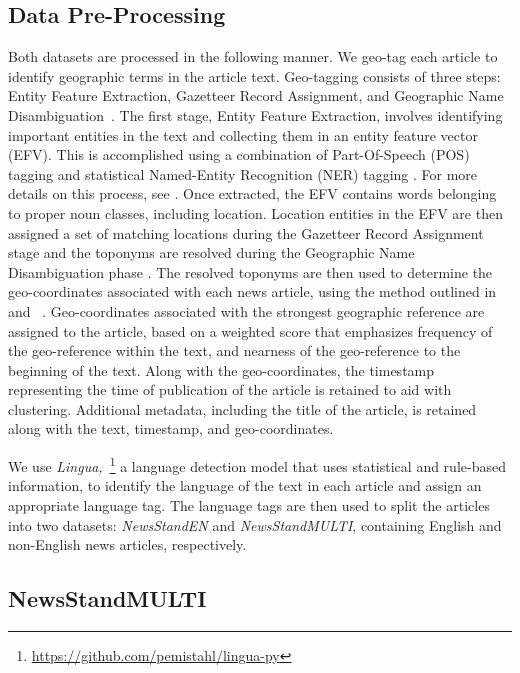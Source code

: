 \subsection{Data Pre-Processing}
Both datasets are processed in the following manner.
We geo-tag each article to identify geographic terms in the article text.
Geo-tagging consists of three steps: Entity Feature Extraction, Gazetteer Record Assignment, and Geographic Name Disambiguation~\cite{Teit08}. 
The first stage, Entity Feature Extraction, involves identifying important entities in the text and collecting them in an entity feature vector (EFV). 
This is accomplished using a combination of Part-Of-Speech (POS) tagging and statistical Named-Entity Recognition (NER) tagging \cite{NER}. 
For more details on this process, see \cite{Same09d, Lieb07, Ho12}. 
Once extracted, the EFV contains words belonging to proper noun classes, including location. 
Location entities in the EFV are then assigned a set of matching locations during the Gazetteer Record Assignment stage and the toponyms are resolved during the Geographic Name Disambiguation phase \cite{Leid11, Lieb10b, Lieb11, Lieb12, Same14b, Schn21}.
The resolved toponyms are then used to determine the geo-coordinates associated with each news article, using the method outlined in \citeauthor{Teit08}~\cite{Teit08} and \citeauthor{Lieb07}~\cite{Lieb07}.
Geo-coordinates associated with the strongest geographic reference are assigned to the article, based on a weighted score that emphasizes frequency of the geo-reference within the text, and nearness of the geo-reference to the beginning of the text. 
Along with the geo-coordinates, the timestamp representing the time of publication of the article is retained to aid with clustering. 
Additional metadata, including the title of the article, is retained along with the text, timestamp, and geo-coordinates.

We use \textit{Lingua,}~\footnote{\url{https://github.com/pemistahl/lingua-py}} a language detection model that uses statistical and rule-based information, to identify the language of the text in each article and assign an appropriate language tag.
The language tags are then used to split the articles into two datasets: \emph{NewsStandEN} and \emph{NewsStandMULTI}, containing English and non-English news articles, respectively.

\subsection{NewsStandMULTI}


